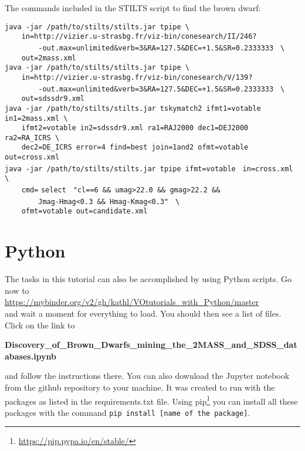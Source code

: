 \documentclass [a4paper, 12pt]{article}
\begin{document}
The commands included in the STILTS script to find the brown dwarf:\\
\begin{small}
\noindent\verb|java -jar /path/to/stilts/stilts.jar tpipe \| \\
\verb|    |
\textquotesingle
\verb|in=http://vizier.u-strasbg.fr/viz-bin/conesearch/II/246?| \\
\verb|        -out.max=unlimited&verb=3&RA=127.5&DEC=+1.5&SR=0.2333333|
\textquotesingle
\verb| \|\\
\verb|    out=2mass.xml| \\

\noindent\verb|java -jar /path/to/stilts/stilts.jar tpipe \| \\
\verb|    |
\textquotesingle
\verb|in=http://vizier.u-strasbg.fr/viz-bin/conesearch/V/139?| \\
\verb|        -out.max=unlimited&verb=3&RA=127.5&DEC=+1.5&SR=0.2333333|
\textquotesingle
\verb| \| \\
\verb|    out=sdssdr9.xml| \\

\noindent\verb|java -jar /path/to/stilts/stilts.jar tskymatch2 ifmt1=votable |
\verb|in1=2mass.xml \| \\
\verb|    ifmt2=votable in2=sdssdr9.xml ra1=RAJ2000 dec1=DEJ2000 |
\verb|ra2=RA_ICRS \| \\
\verb|    dec2=DE_ICRS error=4 find=best join=1and2 ofmt=votable |
\verb|out=cross.xml| \\

\noindent\verb|java -jar /path/to/stilts/stilts.jar tpipe ifmt=votable |
\verb|in=cross.xml \| \\
\verb|    cmd=|\textquotesingle
\verb|select |
\verb|"cl==6 && umag>22.0 && gmag>22.2 && |\\
\verb|        Jmag-Hmag<0.3 && Hmag-Kmag<0.3"|
\textquotesingle
\verb| \| \\
\verb|    ofmt=votable out=candidate.xml| \\
\end{small}


\section{Python}
The tasks in this tutorial can also be accomplished by using Python scripts.
Go now to \\
\url{https://mybinder.org/v2/gh/kathl/VOtutorials_with_Python/master}\\
and wait a moment for everything to load. You should then see a list of files.
Click on the link to

\textbf{Discovery\_of\_Brown\_Dwarfs\_mining\_the\_2MASS\_and\_SDSS\_databases.ipynb}

\noindent and follow the instructions there. You can also download the Jupyter
notebook from the github repository to your
machine. It was created to run with the packages as listed in the
requirements.txt file. Using pip\footnote{\url{https://pip.pypa.io/en/stable/}}
you can install all these packages with the command \texttt{pip install [name
    of the package]}.
%
\end{document}
